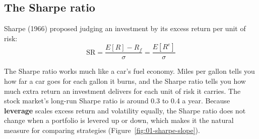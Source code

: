 \subsection{The Sharpe ratio}
\label{sec:01-sharpe}

Sharpe (1966) proposed judging an investment by its excess return per unit of risk:
\begin{equation}
  \mathrm{SR} = \frac{E[R] - R_f}{\sigma} = \frac{E[R^{e}]}{\sigma}
  \label{eq:01-sr}
\end{equation}

The Sharpe ratio works much like a car's fuel economy. Miles per gallon tells you how far a car goes for each gallon it burns, and the Sharpe ratio tells you how much extra return an investment delivers for each unit of risk it carries. The stock market's long-run Sharpe ratio is around 0.3 to 0.4 a year. Because \textbf{leverage} scales excess return and volatility equally, the Sharpe ratio does not change when a portfolio is levered up or down, which makes it the natural measure for comparing strategies (Figure~\ref{fig:01-sharpe-slope}).



